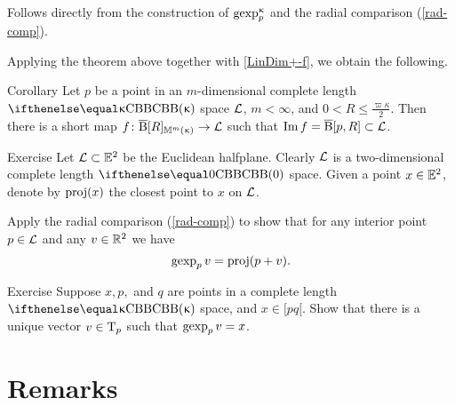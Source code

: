 Follows directly from the construction of $\mathop{\rm gexp}\nolimits^{\upkappa}_p$ and the radial comparison (\ref{rad-comp}).
\qeds

Applying the theorem above together with \ref{LinDim+-f},
we obtain the following.

{\sloppy 
 
\begin{thm}{Corollary}\label{cor:short-map-to-ball}
Let $p$ be a point in an $m$-dimensional complete length $\Alex\kappa$ space $\mathcal{L}$,
$m<\infty$, and $0<R\le\tfrac{\varpi\kappa}2$.
Then there is a short map 
$f\:\cBall[R]_{\Lob{m}{\kappa}}\to \spc{L}$
such that $\Im f= \cBall[p,R]\subset \spc{L}$.
\end{thm}

}





\begin{thm}{Exercise}\label{ex:gexp} 
Let $\spc{L}\subset\EE^2$ be the Euclidean halfplane. 
Clearly $\mathcal{L}$ is a two-dimensional complete length $\Alex{0}$ space.
Given a point $x\in \EE^2$, denote by $\mathop{\rm proj}\nolimits(x)$ the closest point to $x$ on $\mathcal{L}$. 

Apply the radial comparison (\ref{rad-comp}) to show that for any interior point $p\in \spc{L}$ and any $v\in\R^2$  we have 
\[\mathop{\rm gexp}\nolimits_p v=\mathop{\rm proj}\nolimits(p+v).\]
\end{thm}

\begin{thm}{Exercise}\label{ex:inv-gexp}
Suppose $x,p,$ and $q$ are points in a complete length $\Alex\kappa$ space, and $x\in [pq[$.
Show that there is a unique vector $v\in\T_p$ such that $\mathop{\rm gexp}\nolimits_p v=x$.
\end{thm}

%


\section{Remarks}

